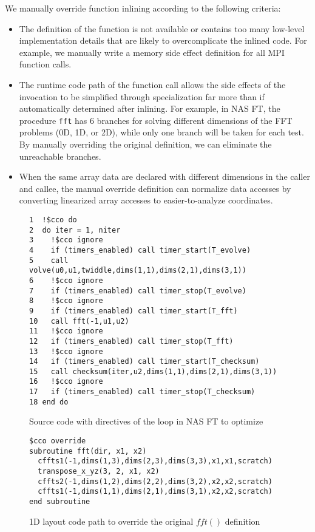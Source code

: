 We manually override function inlining according to the following
criteria:

\begin{itemize}

\item The definition of the function is not available or contains too
  many low-level implementation details that are likely to
  overcomplicate the inlined code.  For example, we manually write a
  memory side effect definition for all MPI function calls.

\item The runtime code path of the function call allows the side
  effects of the invocation to be simplified through specialization
  far more than if automatically determined after inlining.  For
  example, in NAS FT, the procedure \texttt{fft} has 6 branches for
  solving different dimensions of the FFT problems (0D, 1D, or 2D),
  while only one branch will be taken for each test.  By manually
  overriding the original definition, we can eliminate the unreachable
  branches.

\item When the same array data are declared with different dimensions
  in the caller and callee, the manual override definition can
  normalize data accesses by converting linearized array accesses to
  easier-to-analyze coordinates.

\end{itemize}


\begin{figure}[h]
{\scriptsize
\begin{verbatim}
1  !$cco do
2  do iter = 1, niter
3    !$cco ignore
4    if (timers_enabled) call timer_start(T_evolve)
5    call volve(u0,u1,twiddle,dims(1,1),dims(2,1),dims(3,1))
6    !$cco ignore
7    if (timers_enabled) call timer_stop(T_evolve)
8    !$cco ignore
9    if (timers_enabled) call timer_start(T_fft)
10   call fft(-1,u1,u2)
11   !$cco ignore
12   if (timers_enabled) call timer_stop(T_fft)
13   !$cco ignore
14   if (timers_enabled) call timer_start(T_checksum)
15   call checksum(iter,u2,dims(1,1),dims(2,1),dims(3,1))
16   !$cco ignore
17   if (timers_enabled) call timer_stop(T_checksum)
18 end do
\end{verbatim}
}
\caption{Source code with directives of the loop in NAS FT to optimize}
\label{fig:code:ft}
\end{figure}

\begin{figure}[h]
{\scriptsize
\begin{verbatim}
$cco override
subroutine fft(dir, x1, x2)
  cffts1(-1,dims(1,3),dims(2,3),dims(3,3),x1,x1,scratch)
  transpose_x_yz(3, 2, x1, x2)
  cffts2(-1,dims(1,2),dims(2,2),dims(3,2),x2,x2,scratch)
  cffts1(-1,dims(1,1),dims(2,1),dims(3,1),x2,x2,scratch)
end subroutine
\end{verbatim}
}
\caption{1D layout code path to override the original $fft()$ definition}
\label{fig:annot:ft}
\end{figure}

